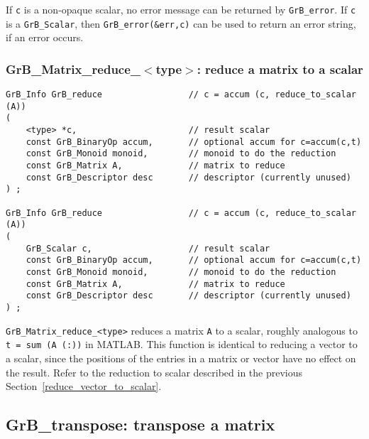 \documentclass[12pt]{article}
\begin{document}
{If \verb'c' is a non-opaque scalar, no error message can be returned by
\verb'GrB_error'.  If \verb'c' is a \verb'GrB_Scalar', then
\verb'GrB_error(&err,c)' can be used to return an error string, if an error
occurs.

\newpage
\subsubsection{{\sf GrB\_Matrix\_reduce\_$<$type$>$:} reduce a matrix to a scalar}
\label{reduce_matrix_to_scalar}

\begin{mdframed}[userdefinedwidth=6in]
{\footnotesize
\begin{verbatim}
GrB_Info GrB_reduce                 // c = accum (c, reduce_to_scalar (A))
(
    <type> *c,                      // result scalar
    const GrB_BinaryOp accum,       // optional accum for c=accum(c,t)
    const GrB_Monoid monoid,        // monoid to do the reduction
    const GrB_Matrix A,             // matrix to reduce
    const GrB_Descriptor desc       // descriptor (currently unused)
) ;

GrB_Info GrB_reduce                 // c = accum (c, reduce_to_scalar (A))
(
    GrB_Scalar c,                   // result scalar
    const GrB_BinaryOp accum,       // optional accum for c=accum(c,t)
    const GrB_Monoid monoid,        // monoid to do the reduction
    const GrB_Matrix A,             // matrix to reduce
    const GrB_Descriptor desc       // descriptor (currently unused)
) ;
\end{verbatim} } \end{mdframed}

\verb'GrB_Matrix_reduce_<type>' reduces a matrix \verb'A' to a scalar, roughly
analogous to \verb't = sum (A (:))' in MATLAB.  This function is identical to
reducing a vector to a scalar, since the positions of the entries in a matrix
or vector have no effect on the result.  Refer to the reduction to scalar
described in the previous Section~\ref{reduce_vector_to_scalar}.

\newpage
\subsection{{\sf GrB\_transpose:} transpose a matrix} %
\label{transpose}

}
\end{document}
